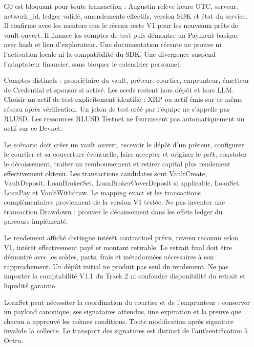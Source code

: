 \documentclass[10pt,a4paper]{article}
\begin{document}
G0 est bloquant pour toute transaction : Augustin relève heure UTC, serveur, network\_\allowbreak id, ledger validé, amendements effectifs, version SDK et état du service. Il confirme avec les mentors que le réseau reste V1 pour les nouveaux prêts de vault ouvert. Il finance les comptes de test puis démontre un Payment basique avec hash et lien d'explorateur. Une documentation récente ne prouve ni l'activation locale ni la compatibilité du SDK. Une divergence suspend l'adaptateur financier, sans bloquer le calendrier personnel.\par

Comptes distincts : propriétaire du vault, prêteur, courtier, emprunteur, émetteur de Credential et sponsor si activé. Les seeds restent hors dépôt et hors LLM. Choisir un actif de test explicitement identifié : XRP ou actif émis sur ce même réseau après vérification. Un jeton de test créé par l'équipe ne s'appelle pas RLUSD. Les ressources RLUSD Testnet ne fournissent pas automatiquement un actif sur ce Devnet.\par

Le scénario doit créer un vault ouvert, recevoir le dépôt d'un prêteur, configurer le courtier et sa couverture éventuelle, faire accepter et originer le prêt, constater le décaissement, traiter un remboursement et retirer capital plus rendement effectivement obtenu. Les transactions candidates sont VaultCreate, VaultDeposit, LoanBrokerSet, LoanBrokerCoverDeposit si applicable, LoanSet, LoanPay et VaultWithdraw. Le mapping exact et les transactions complémentaires proviennent de la version V1 testée. Ne pas inventer une transaction Drawdown : prouver le décaissement dans les effets ledger du parcours implémenté.\par

Le rendement affiché distingue intérêt contractuel prévu, revenu reconnu selon V1, intérêt effectivement payé et montant retirable. Le retrait final doit être démontré avec les soldes, parts, frais et métadonnées nécessaires à son rapprochement. Un dépôt initial ne produit pas seul du rendement. Ne pas importer la comptabilité V1.1 du Track 2 ni confondre disponibilité du retrait et liquidité garantie.\par

LoanSet peut nécessiter la coordination du courtier et de l'emprunteur : conserver un payload canonique, ses signataires attendus, une expiration et la preuve que chacun a approuvé les mêmes conditions. Toute modification après signature invalide la collecte. Le transport des signatures est distinct de l'authentification à Octro.\par
\end{document}

